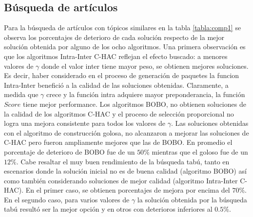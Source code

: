 \subsection{Búsqueda de artículos}
Para la búsqueda de artículos con tópicos similares en la tabla \ref{tabla:comp1} se observa los porcentajes de deterioro de cada solución respecto de la mejor solución obtenida por alguno de los ocho algoritmos. Una primera observación es que los algoritmos  Intra-Inter C-HAC reflejan el efecto buscado: a menores valores de $\gamma$ donde el valor inter tiene mayor peso, se obtienen mejores soluciones. Es decir, haber considerado en el proceso de generación de paquetes la funcion Intra-Inter benefició a la calidad de las soluciones obtenidas. Claramente, a medida que $\gamma$ crece y la función intra adquiere mayor preponderancia, la función $Score$ tiene mejor performance. Los algoritmos BOBO, no obtienen soluciones de la calidad de los algoritmos C-HAC y el proceso de selección proporcional no logra una mejora consistente para todos los valores de $\gamma$. Las soluciones obtenidas con el algoritmo de construcción golosa, no alcanzaron a mejorar las soluciones de C-HAC pero fueron ampliamente mejores que las de BOBO. En promedio el porcentaje de deterioro de BOBO fue de un $50\%$ mientras que el goloso fue de un $12\%$. 
Cabe resaltar el muy buen rendimiento de la búsqueda tabú, tanto en escenarios donde la solución inicial no es de buena calidad (algoritmo BOBO) así como también considerando soluciones de mejor calidad (algoritmo Intra-Inter C-HAC). En el primer caso, se obtienen porcentajes de mejora por encima del $70\%$. En el segundo caso, para varios valores de $\gamma$ la solución obtenida por la búsqueda tabú resultó ser la mejor opción y en otros con deterioros inferiores al $0.5\%$.
